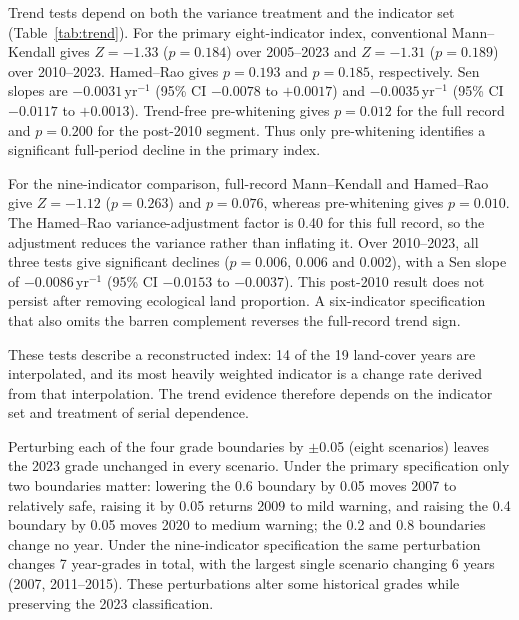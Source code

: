 \documentclass[preprint,11pt,authoryear]{elsarticle}
\begin{document}
Trend tests depend on both the variance treatment and the indicator set (Table~\ref{tab:trend}). For the primary eight-indicator index, conventional Mann--Kendall gives $Z=-1.33$ ($p=0.184$) over 2005--2023 and $Z=-1.31$ ($p=0.189$) over 2010--2023. Hamed--Rao gives $p=0.193$ and $p=0.185$, respectively. Sen slopes are $-0.0031$\,yr$^{-1}$ (95\% CI $-0.0078$ to $+0.0017$) and $-0.0035$\,yr$^{-1}$ (95\% CI $-0.0117$ to $+0.0013$). Trend-free pre-whitening gives $p=0.012$ for the full record and $p=0.200$ for the post-2010 segment. Thus only pre-whitening identifies a significant full-period decline in the primary index.

For the nine-indicator comparison, full-record Mann--Kendall and Hamed--Rao give $Z=-1.12$ ($p=0.263$) and $p=0.076$, whereas pre-whitening gives $p=0.010$. The Hamed--Rao variance-adjustment factor is 0.40 for this full record, so the adjustment reduces the variance rather than inflating it. Over 2010--2023, all three tests give significant declines ($p=0.006$, 0.006 and 0.002), with a Sen slope of $-0.0086$\,yr$^{-1}$ (95\% CI $-0.0153$ to $-0.0037$). This post-2010 result does not persist after removing ecological land proportion. A six-indicator specification that also omits the barren complement reverses the full-record trend sign.

These tests describe a reconstructed index: 14 of the 19 land-cover years are interpolated, and its most heavily weighted indicator is a change rate derived from that interpolation. The trend evidence therefore depends on the indicator set and treatment of serial dependence.

Perturbing each of the four grade boundaries by $\pm$0.05 (eight scenarios) leaves the 2023 grade unchanged in every scenario. Under the primary specification only two boundaries matter: lowering the 0.6 boundary by 0.05 moves 2007 to relatively safe, raising it by 0.05 returns 2009 to mild warning, and raising the 0.4 boundary by 0.05 moves 2020 to medium warning; the 0.2 and 0.8 boundaries change no year. Under the nine-indicator specification the same perturbation changes 7 year-grades in total, with the largest single scenario changing 6 years (2007, 2011--2015). These perturbations alter some historical grades while preserving the 2023 classification.
\end{document}
